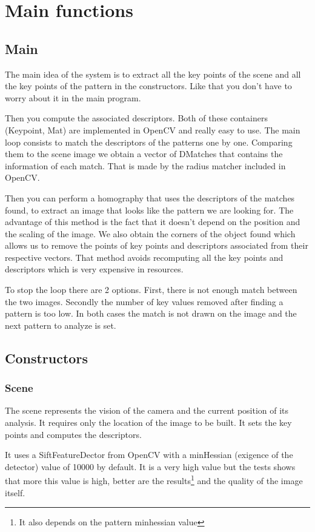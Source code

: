\documentclass[english,a4paper,11pt]{report}
\begin{document}
	\section{Main functions}
	
	\subsection{Main}
	\par The main idea of the system is to extract all the key points of the scene and all the key points of the pattern in the constructors. Like that you don't have to worry about it in the main program. 
 \par Then you compute the associated descriptors. Both of these containers (Keypoint, Mat) are implemented in OpenCV and really easy to use. 
 The main loop consists to match the descriptors of the patterns one by one. Comparing them to the scene image we obtain a vector of DMatches that contains the information of each match. That is made by the radius matcher included in OpenCV. 
	\par Then you can perform a homography that uses the descriptors of the matches found, to extract an image that looks like the pattern we are looking for. The advantage of this method is the fact that it doesn't depend on the position and the scaling of the image. We also obtain the corners of the object found which allows us to remove the points of key points and descriptors associated from their respective vectors. That method avoids recomputing all the key points and descriptors which is very expensive in resources. 
	\par To stop the loop there are 2 options. First, there is not enough match between the two images. Secondly the number of key values removed after finding a pattern is too low. In both cases the match is not drawn on the image and the next pattern to analyze is set.
	\subsection{Constructors}
	\label{constructors}
	\subsubsection{Scene}
	\par The scene represents the vision of the camera and the current position of its analysis.
It requires only the location of the image to be built. It sets the key points and computes the descriptors.
\par It uses a SiftFeatureDector from OpenCV with a minHessian (exigence of the detector) value of 10000 by default. It is a very high value but the tests shows that more this value is high, better are the results\footnote{It also depends on the pattern minhessian value} and the quality of the image itself.
	
\end{document}
